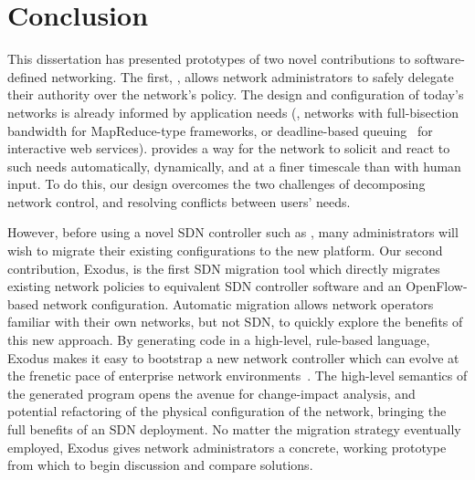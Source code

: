 
\chapter{Conclusion}
\label{sec:conclusion}

This dissertation has presented prototypes of two novel contributions to
software-defined networking. The first, \sys, allows network administrators
to safely delegate their authority over the network's policy.
The design and configuration of today's networks is already informed
by application needs (\eg,
networks with full-bisection bandwidth for MapReduce-type frameworks,
or deadline-based queuing~\cite{Ballani:2011} for interactive web services).
\sys provides a way for the network to solicit and react to such needs
automatically, dynamically, and at a finer timescale than with human input.
To do this, our design overcomes the two challenges of decomposing network
control, and resolving conflicts between users' needs.


However, before using a novel SDN controller such as \sys, many administrators
will wish to migrate their existing configurations to the new platform.
Our second contribution,
Exodus, is the first SDN migration tool which directly migrates existing network
policies to equivalent SDN controller software and an OpenFlow-based
network configuration. Automatic migration allows network operators familiar
with their own networks, but not SDN, to quickly explore the benefits of this new
approach.
By generating code in a high-level, rule-based language, Exodus
makes it easy to bootstrap a new network controller which can evolve
at the frenetic pace of enterprise network environments~\cite{kim11evolution}.
The high-level semantics of the generated program opens the avenue
for change-impact analysis, and potential refactoring of the physical 
configuration of the network, bringing the full benefits of an SDN
deployment.
No matter the migration strategy eventually employed, Exodus gives
network administrators a concrete, working prototype from which to begin
discussion and compare solutions.

